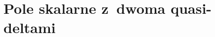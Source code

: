 \documentclass[10pt,t]{beamer}
\begin{document}

















\section{Pole skalarne z~dwoma quasi-deltami}
\end{document}
